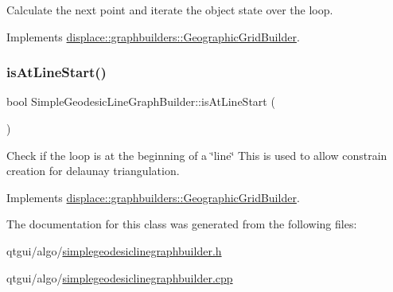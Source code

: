 Calculate the next point and iterate the object state over the loop. 



Implements \mbox{\hyperlink{classdisplace_1_1graphbuilders_1_1_geographic_grid_builder_a4b896b8f9e562644829df273302674b0}{displace\+::graphbuilders\+::\+Geographic\+Grid\+Builder}}.

\mbox{\label{classdisplace_1_1graphbuilders_1_1_simple_geodesic_line_graph_builder_ab13312aee2a6410568267d4c697f34c7}} 
\subsubsection{\texorpdfstring{isAtLineStart()}{isAtLineStart()}}
{\footnotesize\ttfamily bool Simple\+Geodesic\+Line\+Graph\+Builder\+::is\+At\+Line\+Start (\begin{DoxyParamCaption}{ }\end{DoxyParamCaption})\hspace{0.3cm}{\ttfamily [virtual]}}



Check if the loop is at the beginning of a \char`\"{}line\char`\"{} This is used to allow constrain creation for delaunay triangulation. 



Implements \mbox{\hyperlink{classdisplace_1_1graphbuilders_1_1_geographic_grid_builder_ac04ab8be97b357bb12f9745a012f6a5f}{displace\+::graphbuilders\+::\+Geographic\+Grid\+Builder}}.



The documentation for this class was generated from the following files\+:\begin{DoxyCompactItemize}
\item 
qtgui/algo/\mbox{\hyperlink{simplegeodesiclinegraphbuilder_8h}{simplegeodesiclinegraphbuilder.\+h}}\item 
qtgui/algo/\mbox{\hyperlink{simplegeodesiclinegraphbuilder_8cpp}{simplegeodesiclinegraphbuilder.\+cpp}}\end{DoxyCompactItemize}

